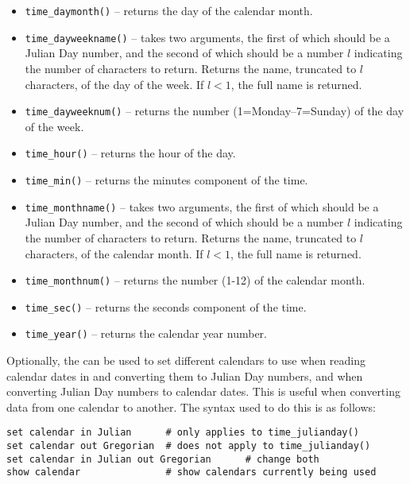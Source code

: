 \begin{itemize}
\item {\tt time\_daymonth()}     -- returns the day of the calendar month.
\item {\tt time\_dayweekname()}  -- takes two arguments, the first of which should be a Julian Day number, and the second of which should be a number $l$ indicating the number of characters to return. Returns the name, truncated to $l$ characters, of the day of the week. If $l<1$, the full name is returned.
\item {\tt time\_dayweeknum()}   -- returns the number (1=Monday--7=Sunday) of the day of the week.
\item {\tt time\_hour()}         -- returns the hour of the day.
\item {\tt time\_min()}          -- returns the minutes component of the time.
\item {\tt time\_monthname()}    -- takes two arguments, the first of which should be a Julian Day number, and the second of which should be a number $l$ indicating the number of characters to return. Returns the name, truncated to $l$ characters, of the calendar month. If $l<1$, the full name is returned.
\item {\tt time\_monthnum()}     -- returns the number (1-12) of the calendar month.
\item {\tt time\_sec()}          -- returns the seconds component of the time.
\item {\tt time\_year()}         -- returns the calendar year number.
\end{itemize}

Optionally, the  can be used to set different calendars
to use when reading calendar dates in and converting them to Julian Day
numbers, and when converting Julian Day numbers to calendar dates. This is
useful when converting data from one calendar to another. The syntax used to do
this is as follows:
\begin{verbatim}
set calendar in Julian      # only applies to time_julianday()
set calendar out Gregorian  # does not apply to time_julianday()
set calendar in Julian out Gregorian      # change both
show calendar               # show calendars currently being used
\end{verbatim}

